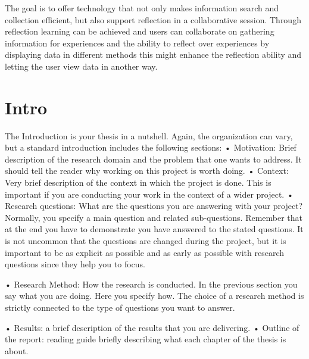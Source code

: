 The goal is to offer technology that not only makes information search and collection efficient, but also support reflection in a collaborative session. Through reflection learning can be achieved and users can collaborate on gathering information for experiences and the ability to reflect over experiences by displaying data in different methods this might enhance the reflection ability and letting the user view data in another way.

\section{Intro}
The Introduction is your thesis in a nutshell. 
Again, the organization can vary, but a
standard introduction includes the following sections:
• Motivation: Brief description of the research domain and the problem that one
wants to address. It should tell the reader why working on this project is worth
doing.
• Context: Very brief description of the context in which the project is done. This
is important if you are conducting your work in the context of a wider project.
• Research questions: What are the questions you are answering with your
project? Normally, you specify a main question and related sub-questions.
Remember that at the end you have to demonstrate you have answered to the
stated questions. It is not uncommon that the questions are changed during the
project, but it is important to be as explicit as possible and as early as possible
with research questions since they help you to focus.

• Research Method: How the research is conducted. In the previous section you
say what you are doing. Here you specify how. The choice of a research method
is strictly connected to the type of questions you want to answer.

• Results: a brief description of the results that you are delivering.
• Outline of the report: reading guide briefly describing what each chapter of the
thesis is about.